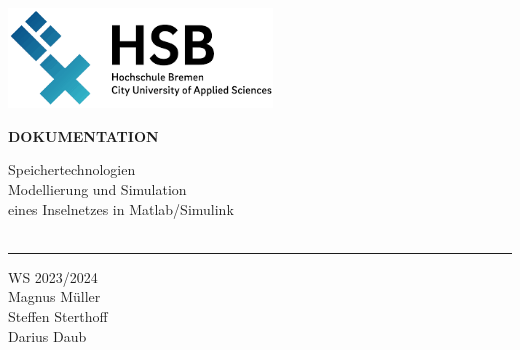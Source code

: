 \begin{titlepage}
    \color{haw}
    \raggedright
    \hfill\includegraphics[width=7cm]{HSB.png}\\
  
    \vspace{5cm}
  
    \setmainfont{Open Sans}
    \small
    \textbf{DOKUMENTATION}
  
    \vspace{8mm}
  
    \begin{minipage}{0.8\linewidth}
      \LARGE
      Speichertechnologien\\[1mm]
      Modellierung und Simulation\\[1mm]
      eines Inselnetzes in Matlab/Simulink\\[1mm]
      \,\rule{11mm}{1.2mm}
    \end{minipage}
  
    \vspace{1cm}
  
    WS 2023/2024\\
    Magnus Müller \\
    Steffen Sterthoff \\
    Darius Daub
  

\end{titlepage}

